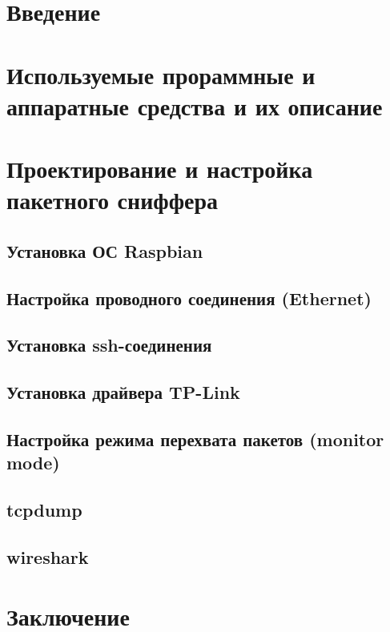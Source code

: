 






\newpage
{}
\tableofcontents

\newpage
{}
\setcounter{section}{0}
\section*{Введение}


\newpage
{}
\section{Используемые прораммные и аппаратные средства и их описание}
\setcounter{figure}{0}


\newpage
{}
\section{Проектирование и настройка пакетного сниффера}
\setcounter{figure}{0}
\subsection{Установка ОС Raspbian}

\subsection{Настройка проводного соединения (Ethernet)}

\subsection{Установка ssh-соединения}

\subsection{Установка драйвера TP-Link}

\subsection{Настройка режима перехвата пакетов (monitor mode)}

\subsection{tcpdump}
%
\subsection{wireshark}
%



\newpage
{}
\setcounter{section}{0}
\section*{Заключение}



\clearpage
\renewcommand{\refname}{Список использованных источников}



